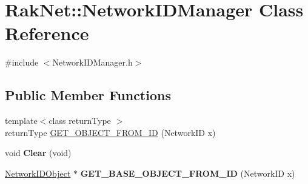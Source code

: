 \hypertarget{class_rak_net_1_1_network_i_d_manager}{\section{Rak\-Net\-:\-:Network\-I\-D\-Manager Class Reference}
\label{class_rak_net_1_1_network_i_d_manager}
}


{\ttfamily \#include $<$Network\-I\-D\-Manager.\-h$>$}

\subsection*{Public Member Functions}
\begin{DoxyCompactItemize}
\item 
{\footnotesize template$<$class return\-Type $>$ }\\return\-Type \hyperlink{class_rak_net_1_1_network_i_d_manager_a8dc711fb7085a294a80939364be5715e}{G\-E\-T\-\_\-\-O\-B\-J\-E\-C\-T\-\_\-\-F\-R\-O\-M\-\_\-\-I\-D} (Network\-I\-D x)
\item 
\hypertarget{class_rak_net_1_1_network_i_d_manager_a19dfcf44bdba73d68b31ef4b8d3a43e4}{void {\bfseries Clear} (void)}\label{class_rak_net_1_1_network_i_d_manager_a19dfcf44bdba73d68b31ef4b8d3a43e4}

\item 
\hypertarget{class_rak_net_1_1_network_i_d_manager_a17e6adc11f0b51e35248c94840eeeaa8}{\hyperlink{class_rak_net_1_1_network_i_d_object}{Network\-I\-D\-Object} $\ast$ {\bfseries G\-E\-T\-\_\-\-B\-A\-S\-E\-\_\-\-O\-B\-J\-E\-C\-T\-\_\-\-F\-R\-O\-M\-\_\-\-I\-D} (Network\-I\-D x)}\label{class_rak_net_1_1_network_i_d_manager_a17e6adc11f0b51e35248c94840eeeaa8}

\end{DoxyCompactItemize}
